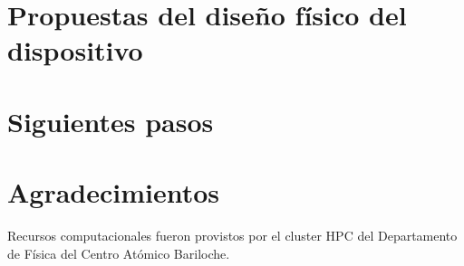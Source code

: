 \documentclass[reprint, superscriptaddress, amsmath, amssymb, aps, prb, floatfix]{revtex4-2}
\begin{document}
\section{Propuestas del diseño físico del dispositivo}

\section{Siguientes pasos}

\section*{Agradecimientos}
Recursos computacionales fueron provistos por el cluster HPC del Departamento de Física del Centro Atómico Bariloche.
\appendix

\end{document}
